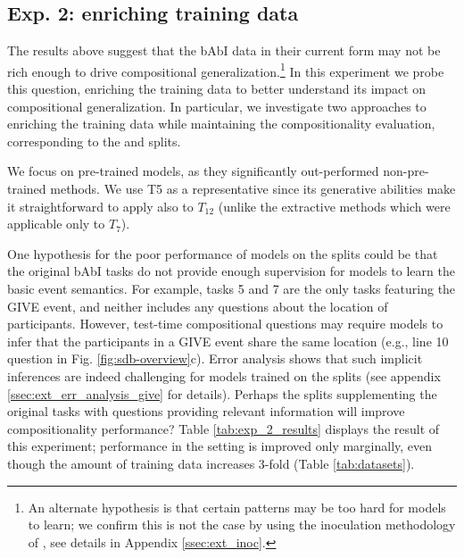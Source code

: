 \subsection{Exp. 2: enriching \babibm training data} 
\label{ssec:exp_2}
The results above suggest that the bAbI data in their current form may not be rich enough to drive compositional generalization.\footnote{An alternate hypothesis is that certain patterns may be too hard for models to learn; we confirm this is not the case by using the inoculation methodology of \citet{liu-etal-2019-inoculation}, see details in Appendix \ref{ssec:ext_inoc}.} In this experiment we probe this  question, enriching the training data to better understand its impact on compositional generalization. In particular, we investigate two approaches to enriching the training data while maintaining the compositionality evaluation, corresponding to the \injectnarg and \diversenarg splits.


We focus on pre-trained models, as they significantly out-performed non-pre-trained methods. We use T5 as a representative since its generative abilities make it straightforward to apply also to $T_{12}$ (unlike the extractive methods which were applicable only to $T_7$). 









 One hypothesis for the poor performance of models on the \mixnarg splits could be that the original bAbI tasks do not provide enough supervision for models to learn the basic event semantics. For example, tasks 5 and 7 are the only \babibm tasks featuring the GIVE event, and neither includes any questions about the location of participants. However, test-time compositional questions may require models to infer that the participants in a GIVE event share the same location (e.g., line 10 question in Fig. \ref{fig:sdb-overview}c). Error analysis shows that such implicit inferences are indeed challenging for models trained on the \concatnarg splits (see appendix \ref{ssec:ext_err_analysis_give} for details). Perhaps the \injectnarg splits supplementing the original tasks with questions providing relevant information will improve compositionality performance? Table \ref{tab:exp_2_results} displays the result of this experiment; performance in the \mixnarg setting is improved only marginally, even though the amount of training data increases 3-fold (Table \ref{tab:datasets}).

